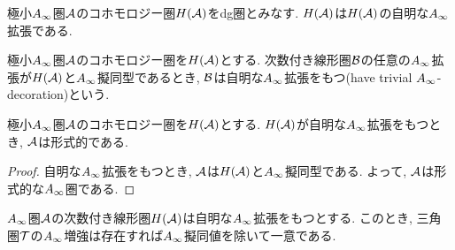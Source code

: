 \documentclass[uplatex, a4paper, 14Q, dvipdfmx]{jsarticle}
\begin{document}
\begin{example}
  極小$A_{\infty}$圏$\mathcal{A}$のコホモロジー圏$H(\mathcal{A})$をdg圏とみなす.  
  $H(\mathcal{A})$は$H(\mathcal{A})$の自明な$A_{\infty}$拡張である. 
\end{example}

\begin{definition}
  極小$A_{\infty}$圏$\mathcal{A}$のコホモロジー圏を$H(\mathcal{A})$とする. 
  次数付き線形圏$\mathcal{B}$の任意の$A_{\infty}$拡張が$H(\mathcal{A})$と$A_{\infty}$擬同型であるとき, $\mathcal{B}$は自明な$A_{\infty}$拡張をもつ(have trivial $A_{\infty}$-decoration)という. 
\end{definition}

\begin{lemma} \label{prop_trivial_Ainf_decoration_induces_formal}
  極小$A_{\infty}$圏$\mathcal{A}$のコホモロジー圏を$H(\mathcal{A})$とする. 
  $H(\mathcal{A})$が自明な$A_{\infty}$拡張をもつとき, $\mathcal{A}$は形式的である. 
\end{lemma}

\begin{proof}
  自明な$A_{\infty}$拡張をもつとき, $\mathcal{A}$は$H(\mathcal{A})$と$A_{\infty}$擬同型である.
  よって, $\mathcal{A}$は形式的な$A_{\infty}$圏である.
\end{proof}

\begin{theorem} \label{prop_trivial_Ainf_decoration_induces_unique_Ainf_enhancement}
  $A_{\infty}$圏$\mathcal{A}$の次数付き線形圏$H(\mathcal{A})$は自明な$A_{\infty}$拡張をもつとする. 
  このとき, 三角圏$\mathcal{T}$の$A_{\infty}$増強は存在すれば$A_{\infty}$擬同値を除いて一意である. 
\end{theorem}
\end{document}
